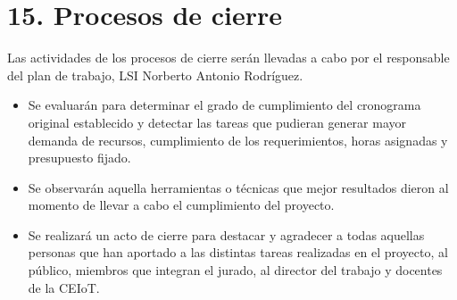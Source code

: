 \documentclass[
11pt, %
]{charter}
\begin{document}


\section{15. Procesos de cierre}    
\label{sec:cierre}

Las actividades de los procesos de cierre serán llevadas a cabo por el responsable del plan de trabajo, LSI Norberto Antonio Rodríguez.

\begin{itemize}
	\item Se evaluarán para determinar el grado de cumplimiento del cronograma original establecido y detectar las tareas que pudieran generar mayor demanda de recursos, cumplimiento de los requerimientos, horas asignadas y presupuesto fijado.
	 
	\item Se observarán aquella herramientas o técnicas que mejor resultados dieron al momento de llevar a cabo el cumplimiento del proyecto.
	
	\item Se realizará un acto de cierre para destacar y agradecer a todas aquellas personas que han aportado a las distintas tareas realizadas en el proyecto, al público, miembros que integran el jurado, al director del trabajo y docentes de la CEIoT.
\end{itemize}

\end{document}
